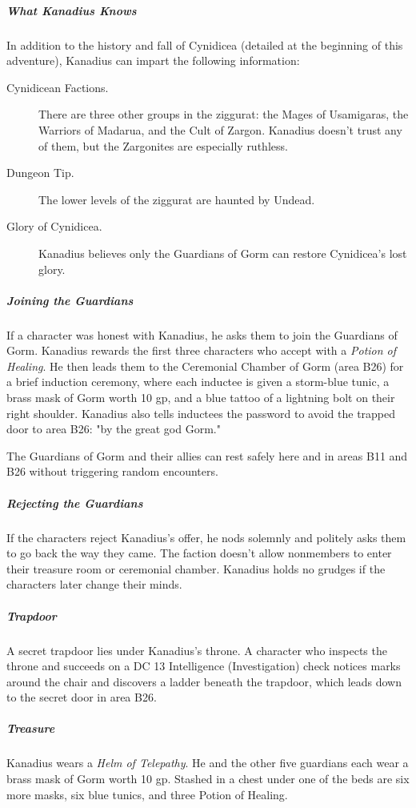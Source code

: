 \documentclass[10pt,a4paper,twoside,bg=print,twocolumn,openany,nodeprecatedcode]{dndbook}
\begin{document}
\subparagraph{What Kanadius Knows}
In addition to the history and fall of Cynidicea (detailed at the beginning of this adventure), Kanadius can impart the following information:


\begin{description}
\item[Cynidicean Factions.]
There are three other groups in the ziggurat: the Mages of Usamigaras, the Warriors of Madarua, and the Cult of Zargon. Kanadius doesn't trust any of them, but the Zargonites are especially ruthless.
\item[Dungeon Tip.]
The lower levels of the ziggurat are haunted by Undead.
\item[Glory of Cynidicea.]
Kanadius believes only the Guardians of Gorm can restore Cynidicea's lost glory.
\end{description}

\subparagraph{Joining the Guardians}
If a character was honest with Kanadius, he asks them to join the Guardians of Gorm. Kanadius rewards the first three characters who accept with a \textit{Potion of Healing}. He then leads them to the Ceremonial Chamber of Gorm (area B26) for a brief induction ceremony, where each inductee is given a storm-blue tunic, a brass mask of Gorm worth 10 gp, and a blue tattoo of a lightning bolt on their right shoulder. Kanadius also tells inductees the password to avoid the trapped door to area B26: "by the great god Gorm."

The Guardians of Gorm and their allies can rest safely here and in areas B11 and B26 without triggering random encounters.

\subparagraph{Rejecting the Guardians}
If the characters reject Kanadius's offer, he nods solemnly and politely asks them to go back the way they came. The faction doesn't allow nonmembers to enter their treasure room or ceremonial chamber. Kanadius holds no grudges if the characters later change their minds.

\subparagraph{Trapdoor}
A secret trapdoor lies under Kanadius's throne. A character who inspects the throne and succeeds on a DC 13 Intelligence (Investigation) check notices marks around the chair and discovers a ladder beneath the trapdoor, which leads down to the secret door in area B26.

\subparagraph{Treasure}
Kanadius wears a \textit{Helm of Telepathy}. He and the other five guardians each wear a brass mask of Gorm worth 10 gp. Stashed in a chest under one of the beds are six more masks, six blue tunics, and three Potion of Healing.
\end{document}
